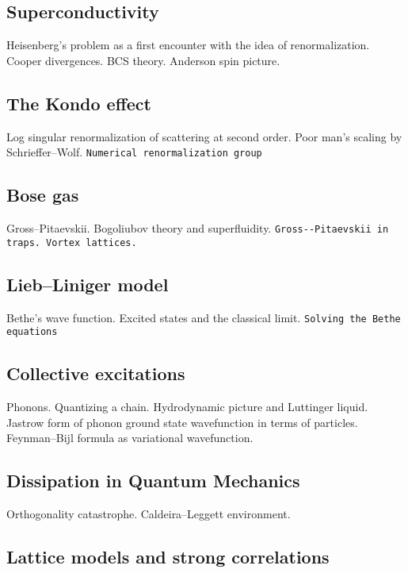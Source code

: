 \subsection{Superconductivity}

Heisenberg's problem as a first encounter with the idea of renormalization. Cooper divergences. BCS theory. Anderson spin picture.

\subsection{The Kondo effect}

Log singular renormalization of scattering at second order. Poor man's scaling by Schrieffer--Wolf. \verb|Numerical renormalization group|

\subsection{Bose gas}

Gross--Pitaevskii. Bogoliubov theory and superfluidity. \verb|Gross--Pitaevskii in traps. Vortex lattices.|

\subsection{Lieb--Liniger model}

Bethe's wave function. Excited states and the classical limit. \verb|Solving the Bethe equations|

\subsection{Collective excitations}

Phonons. Quantizing a chain. Hydrodynamic picture and Luttinger liquid. Jastrow form of phonon ground state wavefunction in terms of particles. Feynman–Bijl formula as variational wavefunction. 

\subsection{Dissipation in Quantum Mechanics}

Orthogonality catastrophe. Caldeira--Leggett environment.

\subsection{Lattice models and strong correlations}

